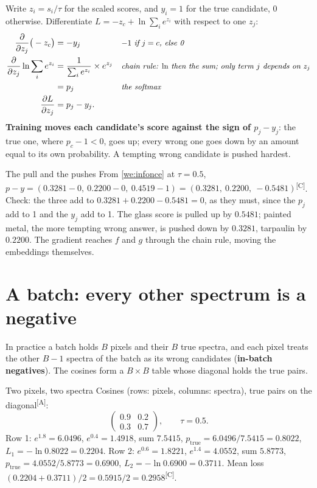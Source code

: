 \documentclass[11pt,a4paper,oneside,openany]{book}
\newcommand{\comp}{\textsuperscript{\textsf{\scriptsize[C]}}}
\newcommand{\assm}{\textsuperscript{\textsf{\scriptsize[A]}}}
\newcommand{\why}[1]{&&\text{\small\itshape #1}}
\begin{document}
Write $z_i=s_i/\tau$ for the scaled scores, and $y_i=1$ for the true candidate, $0$ otherwise. Differentiate $L=-z_c+\ln\sum_ie^{z_i}$ with respect to one $z_j$:
\begin{align*}
\frac{\partial}{\partial z_j}\big(-z_c\big) &= -y_j \why{$-1$ if $j=c$, else 0}\\
\frac{\partial}{\partial z_j}\ln\sum_ie^{z_i} &= \frac{1}{\sum_ie^{z_i}}\times e^{z_j} \why{chain rule: $\ln$ then the sum; only term $j$ depends on $z_j$}\\
 &= p_j \why{the softmax}\\
\frac{\partial L}{\partial z_j} &= p_j-y_j .
\end{align*}
\textbf{Training moves each candidate's score against the sign of $p_j-y_j$}: the true one, where $p_c-1<0$, goes up; every wrong one goes down by an amount equal to its
own probability. A tempting wrong candidate is pushed hardest.

\begin{worked}[label=we:gradient]{The pull and the pushes}
From \cref{we:infonce} at $\tau=0.5$, $p-y=(0.3281-0,\ 0.2200-0,\ 0.4519-1)=(0.3281,\ 0.2200,\ -0.5481)$\comp. Check: the three add to $0.3281+0.2200-0.5481=0$, as
they must, since the $p_j$ add to 1 and the $y_j$ add to 1. The glass score is pulled up by $0.5481$; painted metal, the more tempting wrong answer, is pushed down by $0.3281$,
tarpaulin by $0.2200$. The gradient reaches $f$ and $g$ through the chain rule, moving the embeddings themselves.
\end{worked}

\section{A batch: every other spectrum is a negative}

In practice a batch holds $B$ pixels and their $B$ true spectra, and each pixel treats the other $B-1$ spectra of the batch as its wrong candidates
(\textbf{in-batch negatives}). The cosines form a $B\times B$ table whose diagonal holds the true pairs.

\begin{worked}[label=we:batch]{Two pixels, two spectra}
Cosines (rows: pixels, columns: spectra), true pairs on the diagonal\assm:
\[
  \begin{pmatrix}0.9 & 0.2\\ 0.3 & 0.7\end{pmatrix},\qquad \tau=0.5 .
\]
Row 1: $e^{1.8}=6.0496$, $e^{0.4}=1.4918$, sum $7.5415$, $p_{\text{true}}=6.0496/7.5415=0.8022$, $L_1=-\ln0.8022=0.2204$.
Row 2: $e^{0.6}=1.8221$, $e^{1.4}=4.0552$, sum $5.8773$, $p_{\text{true}}=4.0552/5.8773=0.6900$, $L_2=-\ln0.6900=0.3711$.
Mean loss $(0.2204+0.3711)/2=0.5915/2=0.2958$\comp.
\end{worked}
\end{document}
